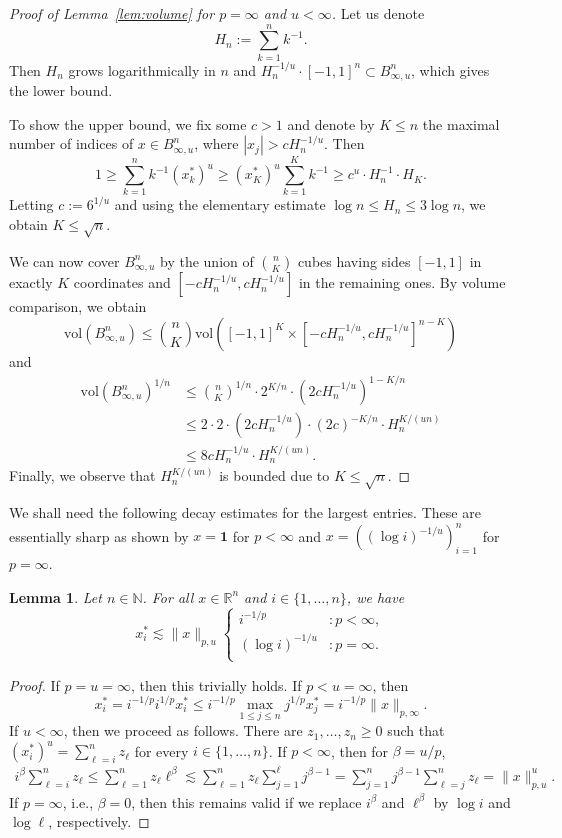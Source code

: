 \documentclass[a4paper,12pt]{article}
\newtheorem{lem}[thm]{Lemma}
\theoremstyle{definition}
\newcommand{\IN}{\mathbb{N}}
\newcommand{\IR}{\mathbb{R}}
\newcommand{\vol}{\mathrm{vol}}
\begin{document}
\begin{proof}[Proof of Lemma~\ref{lem:volume} for $p=\infty$ and $u<\infty$]
Let us denote
\begin{equation}\label{def:Hn}
H_n:=\sum_{k=1}^n k^{-1}.
\end{equation}
Then $H_n$ grows logarithmically in $n$ and  $H_n^{-1/u}\cdot [-1,1]^n\subset B^n_{\infty,u}$, which gives the lower bound.

To show the upper bound, we fix some $c>1$ and denote by $K\le n$ the maximal number of indices of $x\in B^n_{\infty,u}$, where $|x_j|> cH_n^{-1/u}$. Then
\[
1\ge \sum_{k=1}^n k^{-1} (x_k^*)^u\ge (x^*_K)^u\sum_{k=1}^K k^{-1}\ge c^u\cdot  H_n^{-1}\cdot H_K.
\]
Letting $c:=6^{1/u}$ and using the elementary estimate $\log n\le H_n \le 3\log n$, we obtain $K\le \sqrt{n}$.

We can now cover $B^n_{\infty,u}$ by the union of $\binom{n}{K}$ cubes having sides $[-1,1]$ in exactly $K$ coordinates and $[-cH_n^{-1/u},cH_n^{-1/u}]$ in the remaining ones.
By volume comparison, we obtain
\[
\vol(B_{\infty,u}^n)\le \binom{n}{K}\vol([-1,1]^K\times [-cH_n^{-1/u},cH_n^{-1/u}]^{n-K})
\]
and
\begin{align*}
\vol(B_{\infty,u}^n)^{1/n}&\le \binom{n}{K}^{1/n}\cdot 2^{K/n}\cdot (2cH_n^{-1/u})^{1-K/n}\\
&\le 2\cdot 2\cdot (2c H_n^{-1/u})\cdot (2c)^{-K/n}\cdot H_n^{K/(un)}\\
&\le 8c H_n^{-1/u}\cdot H_n^{K/(un)}.
\end{align*}
Finally, we observe that $H_n^{K/(un)}$ is bounded due to $K\le \sqrt{n}$.
\end{proof}

We shall need the following decay estimates for the largest entries. These are essentially sharp as shown by $x=\mathbf{1}$ for $p<\infty$ and $x=( (\log i)^{-1/u})_{i=1}^n$ for $p=\infty$.
\begin{lem}\label{lem:x-star-bound}
Let $n\in\IN$. For all $x\in\IR^n$ and $i\in \{1,\dots,n\}$, we have  
\[
x_i^*\lesssim \|x\|_{p,u}
\begin{cases}
	i^{-1/p}&\colon  p<\infty,\\
	(\log i)^{-1/u}&\colon  p=\infty.\\
\end{cases}
\]
\end{lem}
\begin{proof}
If $p=u=\infty$, then this trivially holds. If $p<u=\infty$, then
\[
x_i^*
=i^{-1/p}i^{1/p}x_i^*
\le i^{-1/p}\max_{1\le j\le n}j^{1/p}x_j^*
=i^{-1/p}\|x\|_{p,\infty}.
\]
If $u<\infty$, then we proceed as follows. There are $z_{1},\dots,z_{n}\ge 0$ such that $(x_i^*)^u=\sum_{\ell=i}^{n}z_{\ell}$ for every $i\in\{1,\dots, n\}$. If $p<\infty$, then for $\beta=u/p$,
\begin{align*}
	i^{\beta}\sum_{\ell=i}^{n}z_{\ell}
\le \sum_{\ell=1}^{n}z_{\ell}\ell^{\beta}
\lesssim \sum_{\ell=1}^{n}z_{\ell}\sum_{j=1}^{\ell}j^{\beta-1}
= \sum_{j=1}^{n}j^{\beta-1}\sum_{\ell=j}^{n}z_{\ell}
=\|x\|_{p,u}^u.
\end{align*}
If $p=\infty$, i.e., $\beta=0$, then this remains valid if we replace $i^{\beta}$ and $\ell^\beta$ by $\log i$ and $\log \ell$, respectively.
\end{proof}
\end{document}
